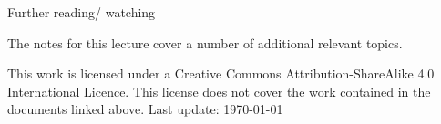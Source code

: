 \documentclass{beamer}
\begin{document}
\begin{frame}{Further reading/ watching}

  The notes for this lecture cover a number of additional relevant topics.

\end{frame}

\tiny This work is licensed under a Creative Commons
Attribution-ShareAlike 4.0 International Licence. This license does
not cover the work contained in the documents linked above. Last
update: \today
\end{document}
